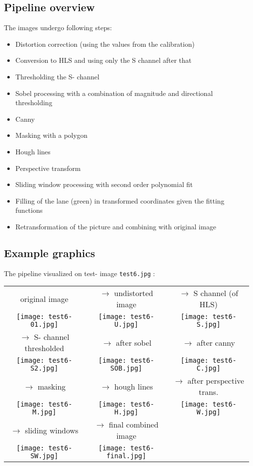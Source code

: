 \documentclass[a4paper]{article}
\begin{document}
\subsection{Pipeline overview}
The images undergo following steps:
\begin{itemize}
\item Distortion correction (using the values from the calibration)
\item Conversion to HLS and using only the S channel after that
\item Thresholding the S- channel
\item Sobel processing with a combination of magnitude and directional thresholding
\item Canny
\item Masking with a polygon
\item Hough lines
\item Perspective transform
\item Sliding window processing with second order polynomial fit
\item Filling of the lane (green) in transformed coordinates given the fitting functions
\item Retransformation of the picture and combining with original image
\end{itemize}

\subsection{Example graphics}
The pipeline visualized on test- image \texttt{test6.jpg}
:\\
\small
\begin{tabular}{ |c|c|c }
  \hline
  original image & $\rightarrow$ undistorted image & $\rightarrow$ S channel (of HLS) \\
  \texttt{[image: test6-01.jpg]} & \texttt{[image: test6-U.jpg]} & \texttt{[image: test6-S.jpg]} \\
  $\rightarrow$ S- channel thresholded & $\rightarrow$ after sobel & $\rightarrow$ after canny \\
  \texttt{[image: test6-S2.jpg]} & \texttt{[image: test6-SOB.jpg]} & \texttt{[image: test6-C.jpg]} \\
  $\rightarrow$ masking & $\rightarrow$ hough lines & $\rightarrow$ after perspective trans. \\
  \texttt{[image: test6-M.jpg]} & \texttt{[image: test6-H.jpg]} & \texttt{[image: test6-W.jpg]} \\
  $\rightarrow$ sliding windows & $\rightarrow$ final combined image & \\
  \texttt{[image: test6-SW.jpg]} & \texttt{[image: test6-final.jpg]} &  \\
  \hline
\end{tabular}
\end{document}
